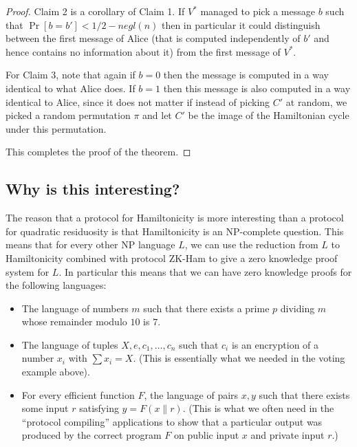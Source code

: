 \begin{proof}
Claim 2 is a corollary of Claim 1. If \(V^*\) managed to pick a message
\(b\) such that \(\Pr[ b=b' ] < 1/2 - negl(n)\) then in particular it
could distinguish between the first message of Alice (that is computed
independently of \(b'\) and hence contains no information about it) from
the first message of \(V^*\).

For Claim 3, note that again if \(b=0\) then the message is computed in
a way identical to what Alice does. If \(b=1\) then this message is also
computed in a way identical to Alice, since it does not matter if
instead of picking \(C'\) at random, we picked a random permutation
\(\pi\) and let \(C'\) be the image of the Hamiltonian cycle under this
permutation.

This completes the proof of the theorem.

\end{proof}

\subsection{Why is this interesting?}\label{13-Why-is-this-interestin}

The reason that a protocol for Hamiltonicity is more interesting than a
protocol for quadratic residuosity is that Hamiltonicity is an
NP-complete question. This means that for every other NP language \(L\),
we can use the reduction from \(L\) to Hamiltonicity combined with
protocol ZK-Ham to give a zero knowledge proof system for \(L\). In
particular this means that we can have zero knowledge proofs for the
following languages:

\begin{itemize}
\item
  The language of numbers \(m\) such that there exists a prime \(p\)
  dividing \(m\) whose remainder modulo \(10\) is \(7\).
\item
  The language of tuples \(X,e,c_1,\ldots,c_n\) such that \(c_i\) is an
  encryption of a number \(x_i\) with \(\sum x_i = X\). (This is
  essentially what we needed in the voting example above).
\item
  For every efficient function \(F\), the language of pairs \(x,y\) such
  that there exists some input \(r\) satisfying \(y=F(x\|r)\). (This is
  what we often need in the ``protocol compiling'' applications to show
  that a particular output was produced by the correct program \(F\) on
  public input \(x\) and private input \(r\).)
\end{itemize}

